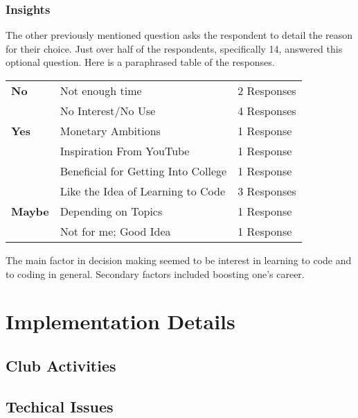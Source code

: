 \documentclass{report}
\begin{document}
        \subsubsection{Insights}

            The other previously mentioned question asks the respondent to detail the reason for their choice. Just over half of the respondents, specifically 14, answered this optional question. Here is a paraphrased table of the responses.\vspace{0.25em}

            \begin{center}
                \begin{tabular}{l|l|l}
                \textbf{No}  & Not enough time           & 2 Responses    \\
                             & No Interest/No Use        & 4 Responses    \\ \hline
                \textbf{Yes} & Monetary Ambitions        & 1 Response     \\
                             & Inspiration From YouTube  & 1 Response     \\
                             & Beneficial for Getting Into College & 1 Response \\
                             & Like the Idea of Learning to Code & 3 Responses \\ \hline
                \textbf{Maybe} & Depending on Topics & 1 Response   \\
                               & Not for me; Good Idea & 1 Response \\
                \end{tabular}
            \end{center}

            The main factor in decision making seemed to be interest in learning to code and to coding in general. Secondary factors included boosting one's career.
    \section{Implementation Details}

        \subsection{Club Activities}



        \subsection{Techical Issues}
\end{document}
